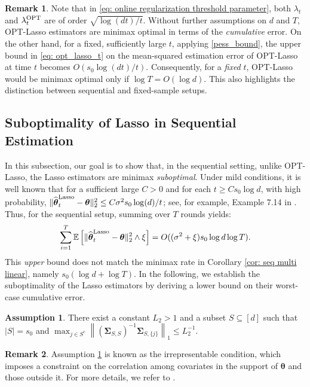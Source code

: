 \documentclass[aos,preprint]{imsart}
\theoremstyle{plain}
\theoremstyle{definition}
\newtheorem{remark}{Remark}
\newtheorem{assumption}{Assumption}
\newcommand{\btheta}{\boldsymbol{\theta}}
\newcommand{\hbtheta}{\widehat{\boldsymbol{\theta}}}
\newcommand{\bSigma}{\boldsymbol{\Sigma}}
\newcommand{\ltheta}{\hbtheta^{\textup{Lasso}}}
\newcommand{\hdlambda}{\lambda^{\textup{OPT}}}
\newcommand{\Exp}{\mathbb{E}}
\begin{document}
\begin{remark}
Note that in \eqref{eq: online regularization threshold parameter}, both $\lambda_t$ and $\hdlambda_t$ are of order $\sqrt{\log(dt)/t}$. Without further assumptions on $d$ and $T$, OPT-Lasso estimators are minimax optimal in terms of the \textit{cumulative} error. On the other hand, for a fixed, sufficiently large $t$, applying  \eqref{pess_bound}, the upper bound in \eqref{eq: opt_lasso_t} on the mean-squared estimation error of OPT-Lasso at time $t$ becomes $O(s_0\log(dt)/t)$. Consequently, for a \textit{fixed} $t$, OPT-Lasso would be minimax optimal only if $\log T = O(\log d)$. This also highlights the distinction between sequential and fixed-sample setups.
\end{remark}


\subsection{Suboptimality of Lasso in Sequential Estimation} \label{sec: suboptimality of lasso}

In this subsection, our goal is to show that, in the sequential setting, unlike OPT-Lasso, the Lasso estimators are minimax \textit{suboptimal}. Under mild conditions, it is well known that for a sufficient large $C > 0$ and for each $t \geq C s_0 \log d$, with high probability,  $\|\ltheta_t-\btheta \|_2^2 \leq C \sigma^2 s_0 \log(d)/t$; see, for example, Example 7.14 in \cite{wainwright2019high}. Thus, for the sequential setup, summing over $T$ rounds yields:
$$\sum_{i=1}^T \Exp\left[\|\ltheta_t-\btheta \|_2^2\wedge \xi\right] = O((\sigma^2+\xi)s_0\log d\log T).$$
This \textit{upper} bound does not match the minimax rate in Corollary \ref{cor: seq multi linear}, namely $s_0(\log d + \log T)$. In the following, we establish the suboptimality of the Lasso estimators by deriving a lower bound on their worst-case cumulative error.



\begin{assumption}\label{assumption: multi linear cov matrix}
There exist a constant $L_2 > 1$ and a subset $S \subseteq [d]$ such that $|S| = s_0$ and 
$\max_{j\in S^c}\left\|(\bSigma_{S,S})^{-1} \bSigma_{S,\{j\}}\right\|_1\le  L_2^{-1}.$
\end{assumption}
\begin{remark}
Assumption \ref{assumption: multi linear cov matrix} is known as the irrepresentable condition, which imposes a constraint on the correlation among covariates in the support of $\btheta$ and those outside it. For more details, we refer to \cite{zhao2006model}. 
\end{remark}
\end{document}
